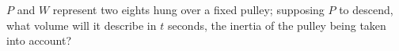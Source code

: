 $P$ and $W$ represent two eights hung over a fixed pulley;
supposing $P$ to descend, what volume will it describe in $t$ 
seconds, the inertia of the pulley being taken into account?
